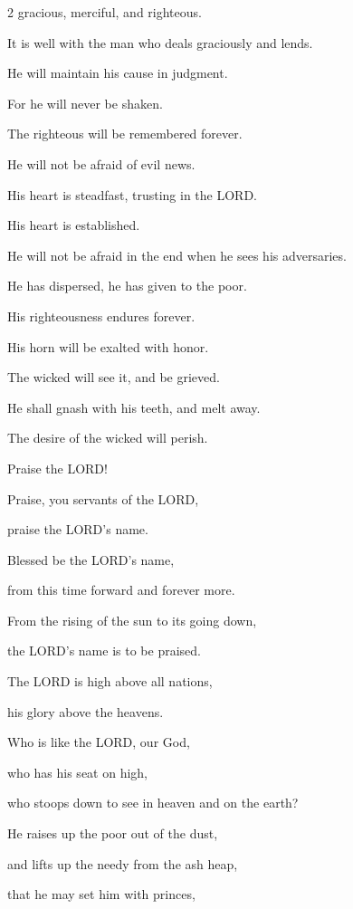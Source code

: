 \begin{multicols}{2}
	gracious, merciful, and righteous.
	
	
	\myverse{}It is well with the man who deals graciously and lends.
	
	He will maintain his cause in judgment.
	
	
	\myverse{}For he will never be shaken.
	
	The righteous will be remembered forever.
	
	
	\myverse{}He will not be afraid of evil news.
	
	His heart is steadfast, trusting in the LORD.
	
	
	\myverse{}His heart is established.
	
	He will not be afraid in the end when he sees his adversaries.
	
	
	\myverse{}He has dispersed, he has given to the poor.
	
	His righteousness endures forever.
	
	His horn will be exalted with honor.
	
	
	\myverse{}The wicked will see it, and be grieved.
	
	He shall gnash with his teeth, and melt away.
	
	The desire of the wicked will perish.
	
	
	\mychapter{} \myverse*{}Praise the LORD!
	
\quad\quad\quad	Praise, you servants of the LORD,
	
	praise the LORD’s name.
	
	
	\myverse{}Blessed be the LORD’s name,
	
	from this time forward and forever more.
	
	
	\myverse{}From the rising of the sun to its going down,
	
	the LORD’s name is to be praised.
	
	
	\myverse{}The LORD is high above all nations,
	
	his glory above the heavens.
	
	
	\myverse{}Who is like the LORD, our God,
	
	who has his seat on high,
	
	
	\myverse{}who stoops down to see in heaven and on the earth?
	
	
	\myverse{}He raises up the poor out of the dust,
	
	and lifts up the needy from the ash heap,
	
	
	\myverse{}that he may set him with princes,
	

\end{multicols}
